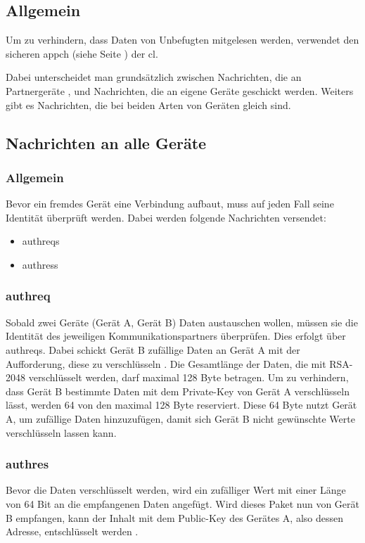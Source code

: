 \subsection{Allgemein}
Um zu verhindern, dass Daten von Unbefugten mitgelesen werden, verwendet \sblit den sicheren \gls{appch} (siehe Seite \pageref{dcl-appch}) der \gls{cl}.

Dabei unterscheidet man grundsätzlich zwischen Nachrichten, die an Partnergeräte , und Nachrichten, die an eigene Geräte geschickt werden. Weiters gibt es Nachrichten, die bei beiden Arten von Geräten gleich sind.

\subsection{Nachrichten an alle Geräte}
\subsubsection{Allgemein}
Bevor ein fremdes Gerät eine Verbindung aufbaut, muss auf jeden Fall seine Identität überprüft werden. Dabei werden folgende Nachrichten versendet:
\begin{itemize}
	\item \gls{authreq}s
	\item \gls{authres}s
\end{itemize}
\subsubsection{\gls*{authreq}}

Sobald zwei Geräte (Gerät A, Gerät B) Daten austauschen wollen, müssen sie die Identität des jeweiligen Kommunikationspartners überprüfen. Dies erfolgt über \gls{authreq}s. Dabei schickt Gerät B zufällige Daten an Gerät A mit der Aufforderung, diese zu verschlüsseln . 
Die Gesamtlänge der Daten, die mit RSA-2048 verschlüsselt werden, darf maximal 128 Byte betragen. Um zu verhindern, dass Gerät B bestimmte Daten mit dem Private-Key von Gerät A verschlüsseln lässt, werden 64 von den maximal 128 Byte reserviert. Diese 64 Byte nutzt Gerät A, um zufällige Daten hinzuzufügen, damit sich Gerät B nicht gewünschte Werte verschlüsseln lassen kann.
\sblitauthreqbytefield

\subsubsection{\gls*{authres}}
Bevor die Daten verschlüsselt werden, wird ein zufälliger Wert mit einer Länge von 64 Bit an die empfangenen Daten angefügt.
Wird dieses Paket nun von Gerät B empfangen, kann der Inhalt mit dem Public-Key des Gerätes A, also dessen Adresse, entschlüsselt werden .
\sblitauthresbytefield
		
